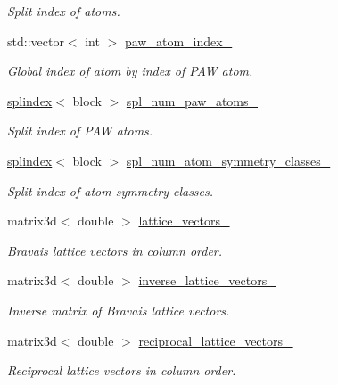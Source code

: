 \begin{DoxyCompactItemize}
\begin{DoxyCompactList}\small\item\em Split index of atoms. \end{DoxyCompactList}\item 
std\+::vector$<$ int $>$ \hyperlink{classsirius_1_1_unit__cell_a1019f35aa919205614783576d4949c7d}{paw\+\_\+atom\+\_\+index\+\_\+}
\begin{DoxyCompactList}\small\item\em Global index of atom by index of P\+A\+W atom. \end{DoxyCompactList}\item 
\hyperlink{classsddk_1_1splindex}{splindex}$<$ block $>$ \hyperlink{classsirius_1_1_unit__cell_af4f208a0c389a4c7c694be67005bd5b0}{spl\+\_\+num\+\_\+paw\+\_\+atoms\+\_\+}
\begin{DoxyCompactList}\small\item\em Split index of P\+A\+W atoms. \end{DoxyCompactList}\item 
\hyperlink{classsddk_1_1splindex}{splindex}$<$ block $>$ \hyperlink{classsirius_1_1_unit__cell_a0f687f85fea7ba773bd6b219716da314}{spl\+\_\+num\+\_\+atom\+\_\+symmetry\+\_\+classes\+\_\+}
\begin{DoxyCompactList}\small\item\em Split index of atom symmetry classes. \end{DoxyCompactList}\item 
matrix3d$<$ double $>$ \hyperlink{classsirius_1_1_unit__cell_acb1fbcd9964cb8415d38c2e23c77c076}{lattice\+\_\+vectors\+\_\+}
\begin{DoxyCompactList}\small\item\em Bravais lattice vectors in column order. \end{DoxyCompactList}\item 
matrix3d$<$ double $>$ \hyperlink{classsirius_1_1_unit__cell_a1b06a6e1dabc61b9bb30fe6aa879e804}{inverse\+\_\+lattice\+\_\+vectors\+\_\+}
\begin{DoxyCompactList}\small\item\em Inverse matrix of Bravais lattice vectors. \end{DoxyCompactList}\item 
matrix3d$<$ double $>$ \hyperlink{classsirius_1_1_unit__cell_af85417314eb39d09ad90de1414fc5bea}{reciprocal\+\_\+lattice\+\_\+vectors\+\_\+}
\begin{DoxyCompactList}\small\item\em Reciprocal lattice vectors in column order. \end{DoxyCompactList}\item 

\end{DoxyCompactItemize}
